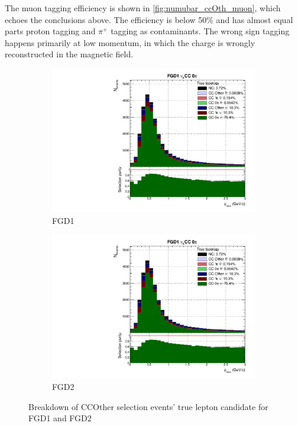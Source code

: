 The muon tagging efficiency is shown in \autoref{fig:numubar_ccOth_muon}, which echoes the conclusions above. The efficiency is below 50\% and has almost equal parts proton tagging and $\pi^+$ tagging as contaminants. The wrong sign tagging happens primarily at low momentum, in which the charge is wrongly reconstructed in the magnetic field.
\begin{figure}[h]
	\begin{subfigure}[t]{0.49\textwidth}
		\includegraphics[width=\textwidth,page=18, trim={0mm 0mm 0mm 9mm}, clip]{figures/mach3/2018/Selection/2018_FullNoRedNDmatrix_rebin_verbose_may_diagnostics}
		\caption{FGD1}
	\end{subfigure}
	\begin{subfigure}[t]{0.49\textwidth}
		\includegraphics[width=\textwidth,page=24, trim={0mm 0mm 0mm 9mm}, clip]{figures/mach3/2018/Selection/2018_FullNoRedNDmatrix_rebin_verbose_may_diagnostics}
		\caption{FGD2}
	\end{subfigure}
	\caption{Breakdown of \numubar CCOther selection events' true lepton candidate for FGD1 and FGD2}
	\label{fig:numubar_ccOth_muon}
\end{figure}

